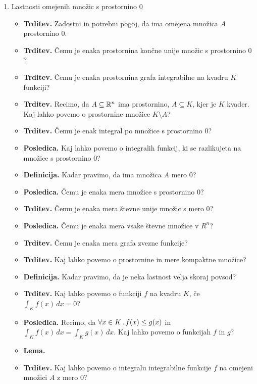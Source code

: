 \begin{enumerate}
    \item Lastnosti omejenih množic s prostornino \(0\)
    \begin{itemize}
        \item \textbf{Trditev.} Zadostni in potrebni pogoj, da ima omejena množica \(A\) prostornino \(0\).
        \item \textbf{Trditev.} Čemu je enaka prostornina končne unije množic s prostornino \(0\)?
        \item \textbf{Trditev.} Čemu je enaka prostornina  grafa integrabilne na kvadru \(K\) funkciji?
        \item \textbf{Trditev.} Recimo, da \(A \subseteq \mathbb{R}^n\) ima prostornino, \(A \subseteq K\), kjer je \(K\) kvader. Kaj lahko povemo o prostornine množice \(K \setminus A\)?
        \item \textbf{Trditev.} Čemu je enak integral po množice s prostornino \(0\)?
        \item \textbf{Posledica.} Kaj lahko povemo o integralih funkcij, ki se razlikujeta na množice s prostornino \(0\)?
        \item \textbf{Definicija.} Kadar pravimo, da ima množica \(A\) mero \(0\)?
        \item \textbf{Posledica.} Čemu je enaka mera množice s prostornino \(0\)?
        \item \textbf{Trditev.} Čemu je enaka mera števne unije množic s mero \(0\)?
        \item \textbf{Posledica.} Čemu je enaka mera vsake števne množice v \(R^n\)?
        \item \textbf{Trditev.} Čemu je enaka mera grafa zvezne funkcije?
        \item \textbf{Trditev.} Kaj lahko povemo o prostornine in mere kompaktne množice?
        \item \textbf{Definicija.} Kadar pravimo, da je neka lastnost velja skoraj povsod?
        \item  \textbf{Trditev.} Kaj lahko povemo o funkciji \(f\) na kvadru \(K\), če \(\int_K f(x) \, dx = 0\)?
        \item \textbf{Posledica.} Recimo, da \(\forall x \in K \,.\, f(x) \leq g(x)\) in \(\int_K f(x) \, dx = \int_K g(x) \, dx\). Kaj lahko povemo o funkcijah \(f\) in \(g\)?
        \item \textbf{Lema.} 
        \item \textbf{Trditev.} Kaj lahko povemo o integralu integrabilne funkcije \(f\) na omejeni množici \(A\) z mero \(0\)?
    \end{itemize}


\end{enumerate}
